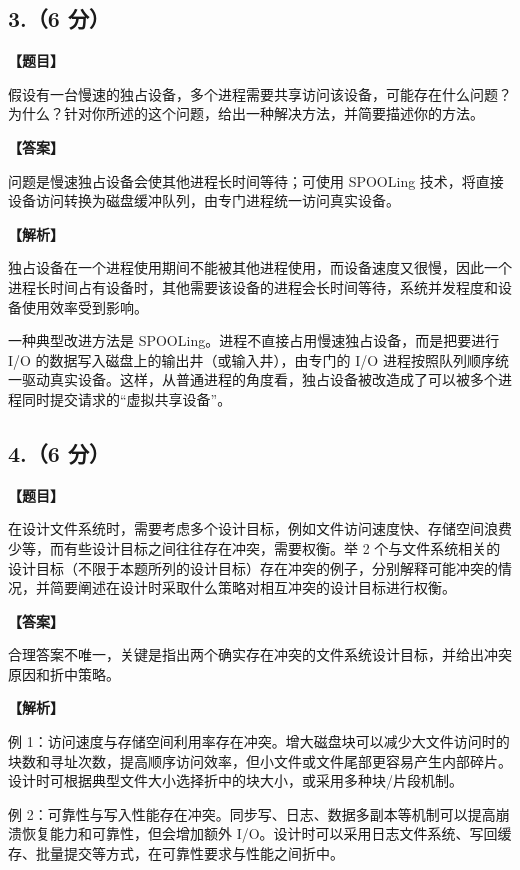 \documentclass[UTF8,12pt]{ctexart}
\newenvironment{question}{\par\medskip\noindent\textbf{【题目】}\par\smallskip}{\par\medskip}
\newenvironment{explanation}{\par\noindent\textbf{【解析】}\par\smallskip}{\par\medskip}
\newenvironment{answer}{\par\noindent\textbf{【答案】}\par\smallskip}{\par}
\begin{document}
\subsection*{3.（6 分）}
\begin{question}
假设有一台慢速的独占设备，多个进程需要共享访问该设备，可能存在什么问题？为什么？针对你所述的这个问题，给出一种解决方法，并简要描述你的方法。
\end{question}

\begin{answer}
问题是慢速独占设备会使其他进程长时间等待；可使用 SPOOLing 技术，将直接设备访问转换为磁盘缓冲队列，由专门进程统一访问真实设备。
\end{answer}

\begin{explanation}
独占设备在一个进程使用期间不能被其他进程使用，而设备速度又很慢，因此一个进程长时间占有设备时，其他需要该设备的进程会长时间等待，系统并发程度和设备使用效率受到影响。

一种典型改进方法是 SPOOLing。进程不直接占用慢速独占设备，而是把要进行 I/O 的数据写入磁盘上的输出井（或输入井），由专门的 I/O 进程按照队列顺序统一驱动真实设备。这样，从普通进程的角度看，独占设备被改造成了可以被多个进程同时提交请求的“虚拟共享设备”。
\end{explanation}
\subsection*{4.（6 分）}
\begin{question}
在设计文件系统时，需要考虑多个设计目标，例如文件访问速度快、存储空间浪费少等，而有些设计目标之间往往存在冲突，需要权衡。举 2 个与文件系统相关的设计目标（不限于本题所列的设计目标）存在冲突的例子，分别解释可能冲突的情况，并简要阐述在设计时采取什么策略对相互冲突的设计目标进行权衡。
\end{question}

\begin{answer}
合理答案不唯一，关键是指出两个确实存在冲突的文件系统设计目标，并给出冲突原因和折中策略。
\end{answer}

\begin{explanation}
例 1：访问速度与存储空间利用率存在冲突。增大磁盘块可以减少大文件访问时的块数和寻址次数，提高顺序访问效率，但小文件或文件尾部更容易产生内部碎片。设计时可根据典型文件大小选择折中的块大小，或采用多种块/片段机制。

例 2：可靠性与写入性能存在冲突。同步写、日志、数据多副本等机制可以提高崩溃恢复能力和可靠性，但会增加额外 I/O。设计时可以采用日志文件系统、写回缓存、批量提交等方式，在可靠性要求与性能之间折中。
\end{explanation}
\end{document}
